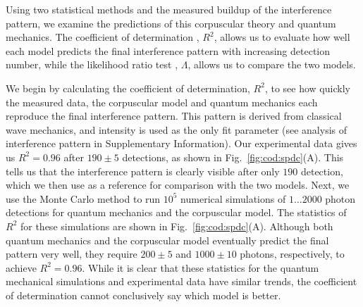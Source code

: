 \documentclass[prl,reprint,twocolumn,amsmath,preprintnumbers,amssymb,superscriptaddress]{revtex4-1}
\newcommand{\figref}[1]{Fig.~\ref{#1}}
\begin{document}
Using two statistical methods and the measured buildup of the interference pattern, we examine the predictions of this corpuscular theory and quantum mechanics. The coefficient of determination \cite{Zwillinger1995}, $R^{2}$, allows us to evaluate how well each model predicts the final interference pattern with increasing detection number, while the likelihood ratio test \cite{Casella2001}, $\Lambda$, allows us to compare the two models. 


We begin by calculating the coefficient of determination, $R^2$, to see how quickly the measured data, the corpuscular model and quantum mechanics each reproduce the final interference pattern. This pattern is derived from classical wave mechanics, and intensity is used as the only fit parameter (see analysis of interference pattern in Supplementary Information). Our experimental data gives us $R^2=0.96$ after $190 \pm 5$ detections, as shown in \figref{fig:cod:spdc}(A). This tells us that the interference pattern is clearly visible after only $190$ detection, which we then use as a reference for comparison with the two models. Next, we use the Monte Carlo method to run $10^5$ numerical simulations of $1\dots 2000$ photon detections for quantum mechanics and the corpuscular model. The statistics of $R^2$ for these simulations are shown in \figref{fig:cod:spdc}(A). Although both quantum mechanics and the corpuscular model eventually predict the final pattern very well, they require $200 \pm 5$ and $1000 \pm 10$ photons, respectively, to achieve $R^2=0.96$. While it is clear that these statistics for the quantum mechanical simulations and experimental data have similar trends, the coefficient of determination cannot conclusively say which model is better.
\end{document}
